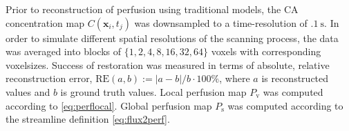 \documentclass[final,5p,times,twocolumn]{elsarticle}
\begin{document}
	Prior to reconstruction of perfusion using traditional models, the CA concentration map $C(\mathbf{x}_i,t_j)$ was downsampled to a time-resolution of $\SI{.1}{\second}$.
	In order to simulate different spatial resolutions of the scanning process, the data was averaged into blocks of $\{1,2,4,8,16,32,64\}$ voxels with corresponding voxelsizes.
	Success of restoration was measured in terms of absolute, relative reconstruction error, $\mathrm{RE}(a,b) :=  |a - b|/b\cdot 100\%$, where $a$ is reconstructed values and $b$ is ground truth values. 
	Local perfusion map $P_{\mathrm{v}}$ was computed according to \eqref{eq:perflocal}. 
	Global perfusion map $P_{\mathrm{s}}$ was computed according to the streamline definition \eqref{eq:flux2perf}.
\end{document}
